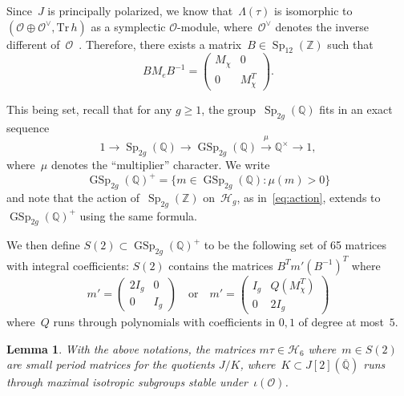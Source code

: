 \documentclass[12pt,oneside]{amsart}
\numberwithin{equation}{section}
\newtheorem{lem}[equation]{Lemma}
\theoremstyle{definition}
\newcommand{\Z}{\mathbb{Z}}
\renewcommand{\O}{\mathcal{O}}
\newcommand{\Q}{\mathbb{Q}}
\newcommand{\Qbar}{\overline{\Q}}
\newcommand{\Half}{\mathcal{H}}
\DeclareMathOperator{\Sp}{Sp}
\DeclareMathOperator{\GSp}{GSp}
\begin{document}
Since~$J$ is principally polarized, we know that~$\Lambda(\tau)$ is isomorphic
to $(\O\oplus\O^\vee, \mathrm{Tr}\, h)$ as a symplectic $\O$-module,
where~$\O^\vee$ denotes the inverse different
of~$\O$~\cite[Prop.~9.2.3]{birkenhakeComplexAbelianVarieties2004}. Therefore,
there exists a matrix~$B\in \Sp_{12}(\Z)$ such that
\begin{equation}
  \label{eq:block-diag}
  BM_e B^{-1} =
  \begin{pmatrix}
    M_\chi & 0 \\ 0 & M_\chi^{T}
  \end{pmatrix}.
\end{equation}

This being set, recall that for any $g\geq 1$, the group~$\Sp_{2g}(\Q)$ fits in
an exact sequence
\begin{equation}
  1\to \Sp_{2g}(\Q) \to \GSp_{2g}(\Q) \overset{\mu}{\to} \Q^\times \to 1,
\end{equation}
where~$\mu$ denotes the ``multiplier'' character. We write
\begin{equation}
  \label{eq:gsp+}
  \GSp_{2g}(\Q)^+ = \{m\in \GSp_{2g}(\Q): \mu(m) >0\}
\end{equation}
and note that the action of~$\Sp_{2g}(\Z)$ on~$\Half_g$, as
in~\eqref{eq:action}, extends to~$\GSp_{2g}(\Q)^+$ using the same formula.

We then define $S(2)\subset \GSp_{2g}(\Q)^+$ to be the following set of 65
matrices with integral coefficients: $S(2)$ contains the matrices $B^{T} m' (B^{-1})^T$
where
\begin{equation}
  \label{eq:S2}
  m' =
  \begin{pmatrix}
    2 I_g & 0 \\ 0 & I_g
  \end{pmatrix} \quad \text{or} \quad m' =
  \begin{pmatrix}
    I_g & Q(M_\chi^T) \\ 0 & 2 I_g
  \end{pmatrix}
\end{equation}
where~$Q$ runs through polynomials with coefficients in ${0,1}$ of degree at
most~$5$.

\begin{lem}
  \label{lem:isog-enum}
  With the above notations, the matrices $m\tau\in \Half_6$ where~$m\in S(2)$
  are small period matrices for the quotients $J/K$,
  where~$K\subset J[2](\Qbar)$ runs through maximal isotropic subgroups stable
  under~$\iota(\O)$.
\end{lem}
\end{document}
